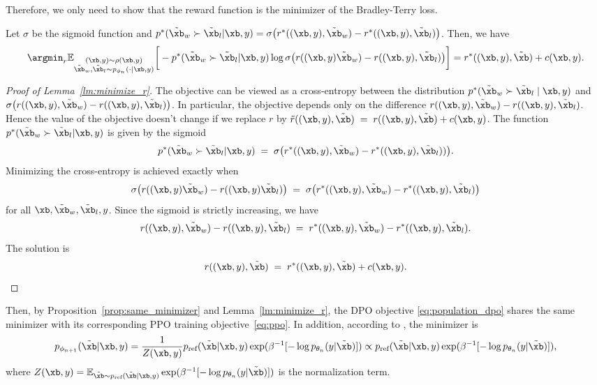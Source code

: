 Therefore, we only need to show that the reward function is the minimizer of the Bradley-Terry loss.
\begin{lemma}\label{lm:minimize_r}
Let $\sigma$ be the sigmoid function and $p^* (\tilde{\xb}_{w} \succ \tilde{\xb}_{l} |\xb,y ) = \sigma\bigl(r^*((\xb,y),\tilde{\xb}_w)-r^*((\xb,y),\tilde{\xb}_l)\bigr) $. Then, we have
\begin{align*}
    \argmin_{r} \mathbb{E}_{\substack{(\xb,y) \sim \rho(\xb,y) \\ \tilde{\xb}_w, \tilde{\xb}_l \sim p_{\phi_n}(\cdot | \xb, y)}} \bigg[ -p^* (\tilde{\xb}_{w} \succ \tilde{\xb}_{l} |\xb,y ) \log\sigma\big(r((\xb,y) \tilde{\xb}_w) - r((\xb,y), \tilde{\xb}_l)\big) \bigg] = r^*((\xb,y), \tilde{\xb}) + c(\xb,y).
\end{align*}
\end{lemma}
\begin{proof}[Proof of Lemma~\ref{lm:minimize_r}]
The objective can be viewed as a cross-entropy between the distribution \(p^*(\tilde{\xb}_w \succ \tilde{\xb}_l \mid \xb, y)\) and \(\sigma\bigl(r((\xb,y),\tilde{\xb}_w)-r((\xb,y),\tilde{\xb}_l)\bigr)\). In particular, the objective depends only on the difference \(r((\xb,y), \tilde{\xb}_w) - r((\xb,y), \tilde{\xb}_l)\). Hence the value of the objective doesn't change if we replace \(r\) by $\tilde{r}((\xb,y), \tilde{\xb})\;=\;r((\xb,y), \tilde{\xb}) + c(\xb,y)$. The function \(p^* (\tilde{\xb}_{w} \succ \tilde{\xb}_{l} |\xb,y )\) is given by the sigmoid 
\[
p^* (\tilde{\xb}_{w} \succ \tilde{\xb}_{l} |\xb,y ) \;=\;\sigma\bigl(r^*((\xb,y), \tilde{\xb}_w) - r^*((\xb,y), \tilde{\xb}_l))\bigr).
\]
Minimizing the cross-entropy is achieved exactly when
\[
\sigma\bigl(r((\xb,y) \tilde{\xb}_w) - r((\xb,y) \tilde{\xb}_l)\bigr)
\;=\;
\sigma\bigl(r^*((\xb,y), \tilde{\xb}_w) - r^*((\xb,y), \tilde{\xb}_l)\bigr)
\]
for all \(\xb, \tilde{\xb}_w, \tilde{\xb}_l, y\). Since the sigmoid is strictly increasing, we have
\[
r((\xb,y), \tilde{\xb}_w) - r((\xb,y), \tilde{\xb}_l) \;=\; r^*((\xb,y), \tilde{\xb}_w) - r^*((\xb,y), \tilde{\xb}_l).
\]
The solution is 
\[
r((\xb,y), \tilde{\xb}) \;=\; r^*((\xb,y), \tilde{\xb}) + c(\xb,y).
\]
\end{proof}

Then, by Proposition~\ref{prop:same_minimizer} and Lemma~\ref{lm:minimize_r}, the DPO objective \eqref{eq:population_dpo} shares the same minimizer with its corresponding PPO training objective~\eqref{eq:ppo}. In addition, according to \citet{rafailov2023direct}, the minimizer is
\begin{align*}
    p_{\phi_{n+1}}(\tilde{\xb}|\xb,y) = \frac{1}{Z(\xb,y)}{p_{\text{ref}}(\tilde{\xb}|\xb,y) \exp(\beta^{-1} [-\log p_{\theta_{n}}(y|\tilde{\xb})] )} \propto  p_{\text{ref}}(\tilde{\xb}|\xb,y) \exp(\beta^{-1} [-\log p_{\theta_{n}}(y|\tilde{\xb})] ), 
\end{align*}
where $Z(\xb,y) = \mathbb{E}_{\tilde{\xb}\sim p_{\text{ref}}(\tilde{\xb} |\xb,y)} \exp(\beta^{-1} [-\log p_{\theta_{n}}(y|\tilde{\xb})] )$ is the normalization term.
